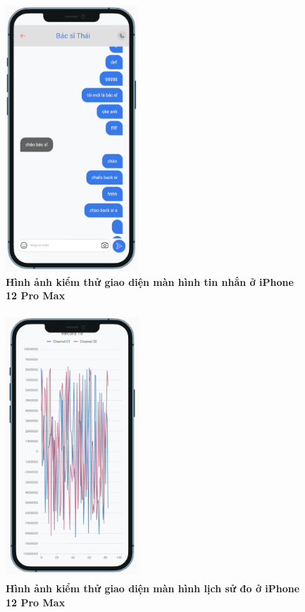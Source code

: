 \begin{figure}[H]
  \centering
  \includegraphics[width=5cm,height=10cm]{Images/mobile_app/demo/ip12_pro_max_device_preview_message_2.png}
  \caption[Hình ảnh kiểm thử giao diện màn hình tin nhắn ở iPhone 12 Pro Max]{\bfseries \fontsize{12pt}{0pt}
  \selectfont Hình ảnh kiểm thử giao diện màn hình tin nhắn ở iPhone 12 Pro Max}
  \label{ip12_pro_max_device_preview_message_2}
\end{figure}

\begin{figure}[H]
  \centering
  \includegraphics[width=5cm,height=10cm]{Images/mobile_app/demo/ios_device_preview_history_record.png}
  \caption[Hình ảnh kiểm thử giao diện màn hình lịch sử đo ở iPhone 12 Pro Max]{\bfseries \fontsize{12pt}{0pt}
  \selectfont Hình ảnh kiểm thử giao diện màn hình lịch sử đo ở iPhone 12 Pro Max}
  \label{ios_device_preview_history_record}
\end{figure}

